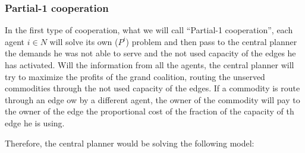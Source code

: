 \documentclass[review]{elsarticle}
\begin{document}
\subsubsection*{Partial-1 cooperation}


In the first type of cooperation, what we will call ``Partial-1 cooperation'', each agent $i\in N$ will solve its own ($P^i$) problem and 
then pass to the central planner the demands he was not able to serve and the not used capacity of the 
edges he has activated. Will the information from all the agents, the central planner will try to maximize
the profits of the grand coalition, routing the unserved commodities through the not used capacity
of the edges. If a commodity is route through an edge ow by a different agent, the owner of the commodity
will pay to the owner of the edge the proportional cost of the fraction of the capacity of th edge he is using.

Therefore, the central planner would be solving the following model:
\end{document}

